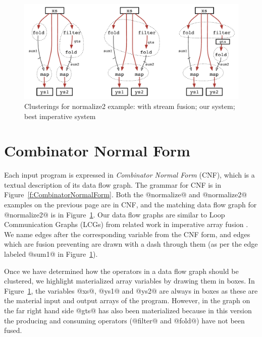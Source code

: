 
\begin{figure}[ht!]
\begin{center}
\includegraphics[scale=0.5]{figures/ex1-compare.pdf}
\end{center}
\caption{Clusterings for normalize2 example: with stream fusion; our system; best imperative system}
\label{f:normalize2-clusterings}
\end{figure}


\section{Combinator Normal Form}
Each input program is expressed in \emph{Combinator Normal Form} (CNF), which is a textual description of its data flow graph. The grammar for CNF is in Figure~\ref{f:CombinatorNormalForm}. Both the @normalize@ and @normalize2@ examples on the previous page are in CNF, and the matching data flow graph for @normalize2@ is in Figure~\ref{f:normalize2-clusterings}. Our data flow graphs are similar to Loop Communication Graphs (LCGs) from related work in imperative array fusion \CITE. We name edges after the corresponding variable from the CNF form, and edges which are fusion preventing are drawn with a dash through them (as per the edge labeled @sum1@ in Figure~\ref{f:normalize2-clusterings}). 

Once we have determined how the operators in a data flow graph should be clustered, we highlight materialized array variables by drawing them in boxes. In Figure~\ref{f:normalize2-clusterings}, the variables @xs@, @ys1@ and @ys2@ are always in boxes as these are the material input and output arrays of the program. However, in the graph on the far right hand side @gts@ has also been materialized because in this version the producing and consuming operators (@filter@ and @fold@) have not been fused.

